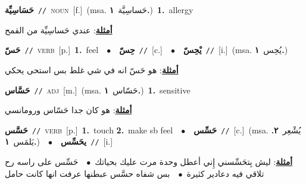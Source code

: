 \documentclass[10pt,a4paper,twoside]{article} %
\begin{document}
\begin{multicols}{2}
{\setlength\topsep{0pt}\textbf{\foreignlanguage{arabic}{حَسَاسِيِّة}}\ {\color{gray}\texttt{//}\color{black}}\ \textsc{noun}\ [f.]\ \color{gray}(msa. \foreignlanguage{arabic}{حَساسِيَّة}~\foreignlanguage{arabic}{\textbf{١.}})\color{black}\ \textbf{1.}~allergy\  \begin{flushright}\color{gray}\foreignlanguage{arabic}{\textbf{\underline{\foreignlanguage{arabic}{أمثلة}}}: عندي حَساسِيِّة من القمح}\end{flushright}\color{black}} \vspace{2mm}

{\setlength\topsep{0pt}\textbf{\foreignlanguage{arabic}{حَسّ}}\ {\color{gray}\texttt{//}\color{black}}\ \textsc{verb}\ [p.]\ \textbf{1.}~feel\ \ $\bullet$\ \ \setlength\topsep{0pt}\textbf{\foreignlanguage{arabic}{حِسّ}}\ {\color{gray}\texttt{//}\color{black}}\ [c.]\ \ $\bullet$\ \ \setlength\topsep{0pt}\textbf{\foreignlanguage{arabic}{يْحِسّ}}\ {\color{gray}\texttt{//}\color{black}}\ [i.]\ \color{gray}(msa. \foreignlanguage{arabic}{يُحِس}~\foreignlanguage{arabic}{\textbf{١.}})\color{black}\  \begin{flushright}\color{gray}\foreignlanguage{arabic}{\textbf{\underline{\foreignlanguage{arabic}{أمثلة}}}: هو حَسّ انه في شي غلط بس استحى يحكي}\end{flushright}\color{black}} \vspace{2mm}

{\setlength\topsep{0pt}\textbf{\foreignlanguage{arabic}{حَسَّاس}}\ {\color{gray}\texttt{//}\color{black}}\ \textsc{adj}\ [m.]\ \color{gray}(msa. \foreignlanguage{arabic}{حَسّاس}~\foreignlanguage{arabic}{\textbf{١.}})\color{black}\ \textbf{1.}~sensitive\  \begin{flushright}\color{gray}\foreignlanguage{arabic}{\textbf{\underline{\foreignlanguage{arabic}{أمثلة}}}: هو كان جدا حَسّاس ورومانسي}\end{flushright}\color{black}} \vspace{2mm}

{\setlength\topsep{0pt}\textbf{\foreignlanguage{arabic}{حَسَّس}}\ {\color{gray}\texttt{//}\color{black}}\ \textsc{verb}\ [p.]\ \textbf{1.}~touch  \textbf{2.}~make sb feel\ \ $\bullet$\ \ \setlength\topsep{0pt}\textbf{\foreignlanguage{arabic}{حَسِّس}}\ {\color{gray}\texttt{//}\color{black}}\ [c.]\ \color{gray}(msa. \foreignlanguage{arabic}{يُشْعِر}~\foreignlanguage{arabic}{\textbf{٢.}}  \foreignlanguage{arabic}{يَلمَس}~\foreignlanguage{arabic}{\textbf{١.}})\color{black}\ \ $\bullet$\ \ \setlength\topsep{0pt}\textbf{\foreignlanguage{arabic}{يحَسِّس}}\ {\color{gray}\texttt{//}\color{black}}\ [i.]\  \begin{flushright}\color{gray}\foreignlanguage{arabic}{\textbf{\underline{\foreignlanguage{arabic}{أمثلة}}}: ليش بِتحَسِّسني إِني أعطل وحدة مرت عليك بحياتك\ $\bullet$\ \  حَسِّس على راسه رح تلاقي فيه دعادير كثيرة\ $\bullet$\ \  بس شفاه حسَّس عبطنها عرفت انها كانت حامل}\end{flushright}\color{black}} \vspace{2mm}


\end{multicols}
\end{document}
